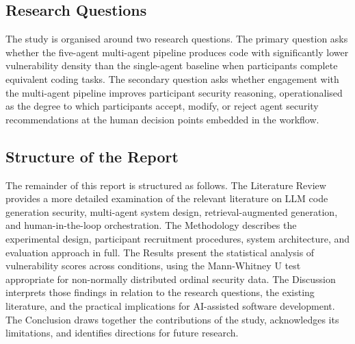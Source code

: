 \documentclass[11pt, a4paper]{article}
\begin{document}
\subsection*{Research Questions}

The study is organised around two research questions. The primary question asks whether the five-agent multi-agent pipeline produces code with significantly lower vulnerability density than the single-agent baseline when participants complete equivalent coding tasks. The secondary question asks whether engagement with the multi-agent pipeline improves participant security reasoning, operationalised as the degree to which participants accept, modify, or reject agent security recommendations at the human decision points embedded in the workflow.

\subsection*{Structure of the Report}

The remainder of this report is structured as follows. The Literature Review provides a more detailed examination of the relevant literature on LLM code generation security, multi-agent system design, retrieval-augmented generation, and human-in-the-loop orchestration. The Methodology describes the experimental design, participant recruitment procedures, system architecture, and evaluation approach in full. The Results present the statistical analysis of vulnerability scores across conditions, using the Mann-Whitney U test appropriate for non-normally distributed ordinal security data. The Discussion interprets those findings in relation to the research questions, the existing literature, and the practical implications for AI-assisted software development. The Conclusion draws together the contributions of the study, acknowledges its limitations, and identifies directions for future research.

\end{document}
